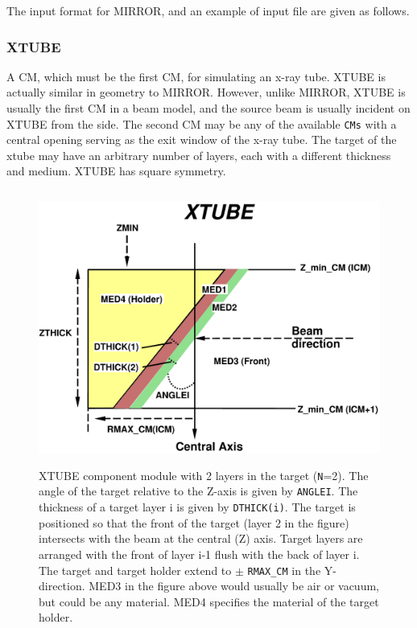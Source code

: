 \documentclass[12pt,twoside]{article}
\begin{document}
The input format for MIRROR, and an example of input file are given as
follows.

\begin{small}

\end{small}


\newpage
\subsubsection{XTUBE}
\renewcommand{\rightmark}{XTUBE CM}

A CM, which must be the first CM, for simulating an x-ray tube.  XTUBE is actually
similar in geometry to MIRROR.  However, unlike MIRROR, XTUBE is usually
the first CM in a beam model, and the source beam is usually incident on XTUBE
from the side.  The second CM may be any of the available  \verb+CMs+ with a
central opening serving as the exit
window of the x-ray tube.  The target of the xtube may
have an arbitrary number of layers, each with a different thickness and
medium.  XTUBE has square
symmetry.

\begin{figure}[htbp]
\begin{center}
\leavevmode
\mbox{}\hspace{0cm}
\includegraphics[height=9cm]{figures/xtubed}
\caption[XTUBE CM geometry.]
{XTUBE component module with 2 layers in the target ({\tt N}=2).
The angle of the target relative to the Z-axis is given by {\tt ANGLEI}.  The
thickness of a target layer i is given by {\tt DTHICK(i)}.  The target is
positioned so that the front of the target (layer 2 in the figure)
intersects with the beam at the central (Z) axis.  Target layers are
arranged with the front of layer i-1 flush with the back of layer i.
The target and target holder extend to $\pm$ {\tt RMAX\_CM} in the Y-direction.
MED3 in the figure above would usually be air or vacuum, but could be any
material.  MED4 specifies the material of the target holder.}
\label{fig_XTUBED}
\end{center}
\end{figure}
\clearpage
\end{document}
